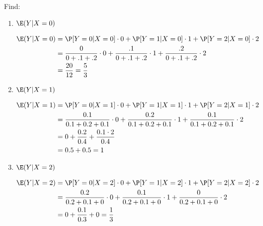 Find:
\begin{enumerate}[label=(\alph*)]
\item $\E(Y|X=0)$
\begin{solution}[1cm]
\begin{equation}
\begin{split}
\E(Y|X=0) &= \P[Y=0|X=0] \cdot 0 + \P[Y=1|X=0] \cdot 1 + \P[Y=2|X=0] 
\cdot 2 \\ \nonumber
	    &= \frac{0}{0+.1+.2} \cdot 0 + \frac{.1}{0+.1+.2} \cdot 1 + 
	    \frac{.2}{0+.1+.2} \cdot 2 \\
	    &= \frac{20}{12} = \frac{5}{3}
\end{split}
\end{equation}
\end{solution}

\item $\E(Y|X=1)$
\begin{solution}[1cm]
\begin{equation}
\begin{split}
\E(Y|X=1) &= \P[Y=0|X=1] \cdot 0 + \P[Y=1|X=1] \cdot 1 + \P[Y=2|X=1] 
\cdot 2 \\ \nonumber
	    &= \frac{0.1}{0.1 + 0.2 + 0.1}  \cdot 0 +  \frac{0.2}{0.1 + 0.2 + 0.1} 
	    \cdot 1 +  \frac{0.1}{0.1 + 0.2 + 0.1} \cdot 2 \\
	    &= 0 + \frac{0.2}{0.4} + \frac{0.1 \cdot 2}{0.4} \\
	    &= 0.5 + 0.5 = 1
\end{split}
\end{equation}
\end{solution}


\item $\E(Y|X=2)$
\begin{solution}[1cm]
\begin{equation}
\begin{split}
\E(Y|X=2) &= \P[Y=0|X=2] \cdot 0 + \P[Y=1|X=2] \cdot 1 + \P[Y=2|X=2] 
\cdot 2 \\ \nonumber
	    &= \frac{0.2}{0.2 + 0.1 + 0}  \cdot 0 + \frac{0.1}{0.2 + 0.1 + 0}  
	    \cdot 1 + \frac{0}{0.2 + 0.1 + 0}  \cdot 2 \\
	    &= 0 + \frac{0.1}{0.3} + 0 = \frac{1}{3}
\end{split}
\end{equation}
\end{solution}


\end{enumerate}
